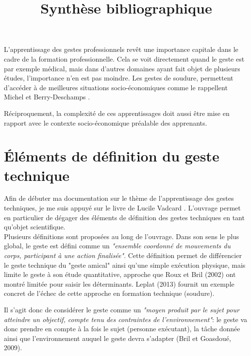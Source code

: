 \documentclass{article}
\begin{document}
\title{Synthèse bibliographique}

L'apprentissage des gestes professionnels revêt une importance capitale
dans le cadre de la formation professionnelle. Cela se voit directement
quand le geste est par exemple médical, mais dans d'autres domaines
ayant fait objet de plusieurs études, l'importance n'en est pas moindre.
Les gestes de soudure, permettent d'accéder à de meilleures situations
socio-économiques comme le rappellent Michel et Berry-Deschamps
\cite{michel_lapprentissage_2008}.

Réciproquement, la complexité de ces apprentissages doit aussi être mise
en rapport avec le contexte socio-économique préalable des apprenants.

\section{Éléments de définition du geste technique}

Afin de débuter ma documentation sur le thème de l'apprentissage des 
gestes techniques, je me suis appuyé sur le livre de Lucile Vadcard 
\cite{vadcard_gestes_2022}.
L'ouvrage permet en particulier de dégager des éléments de définition 
des gestes techniques en tant qu'objet scientifique.
\\

Plusieurs définitions sont proposées au long de l'ouvrage. Dans son sens 
le plus global, le geste est défini comme un \emph{"ensemble coordonné 
de mouvements du corps, participant à une action finalisée"}. Cette 
définition permet de différencier le geste technique du "geste amical" 
ainsi qu'une simple exécution physique, mais limite le geste à son étude 
quantitative, approche que Roux et Bril (2002) ont montré limitée pour 
saisir les déterminants. Leplat (2013) fournit un exemple concret de 
l'échec de cette approche en formation technique (soudure).

Il s'agit donc de considérer le geste comme un \emph{"moyen produit par 
le sujet pour atteindre un objectif, compte tenu des contraintes de 
l'environnement"}: le geste va donc prendre en compte à la fois le sujet 
(personne exécutant), la tâche donnée ainsi que l'environnement auquel 
le geste devra s'adapter (Bril et Goasdoué, 2009).
\\
\end{document}
